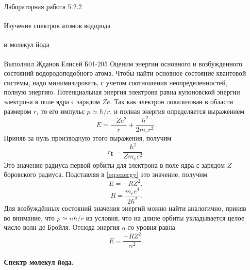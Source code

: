 \documentclass{astroedu-lab}
\begin{document}
\begin{problem}{\huge Лабораторная работа 5.2.2\\\\Изучение спектров атомов водорода\\\\и молекул йода\\\\Выполнил Жданов Елисей Б01-205}
	Оценим энергии основного и возбужденного состояний водородоподобного атома. Чтобы найти основное состояние квантовой системы, надо минимизировать, с учетом соотношения неопределенностей, полную энергию. Потенциальная энергия электрона равна кулоновской энергии электрона в поле ядра с зарядом $ Z e $. Так как электрон локализован в области размером $ r $, то его импульс $ p \simeq \hbar / r $, и полная энергия определяется выражением
	\begin{equation}\label{eq:energy}
		E = \dfrac{-Z e^2}{r}+\dfrac{\hbar^2}{2 m_e r^2}.
	\end{equation}
	Приняв за нуль производную этого выражения, получим
	\begin{equation*}\label{key}
		r_\text{Б} = \dfrac{\hbar^2}{Z m_e e^2}.
	\end{equation*}
	Это значение радиуса первой орбиты для электрона в поле ядра с зарядом $ Z $ -- боровского радиуса. Подставляя в \eqref{eq:energy} это значение, получим
	\begin{equation*}\label{key}
		E = -R Z^2,
	\end{equation*}
	\begin{equation}\label{key}
		R = \dfrac{m_e e^4}{2 \hbar^2}.
	\end{equation}
	Для возбуждённых состояний значения энергий можно найти аналогично, приняв во внимание, что $ p \simeq n \hbar / r $ из условия, что на длине орбиты укладывается целое число волн де Бройля. Отсюда энергия $ n $-го уровня равна 
	\begin{equation*}\label{key}
		E = \dfrac{-R Z^2}{n^2}.
	\end{equation*}
	
	\paragraph{Спектр молекул йода.}
	

\end{problem}
\end{document}
